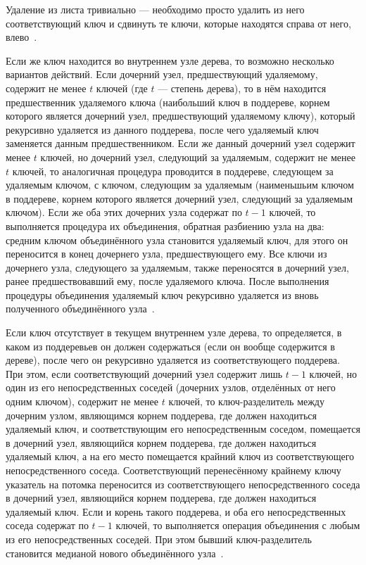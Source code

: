 \documentclass[a4paper,12pt]{article}
\begin{document}
	Удаление из листа тривиально --- необходимо просто удалить из него соответствующий ключ и сдвинуть те ключи, которые находятся справа от него, влево~\cite{Kormen}.
	
	Если же ключ находится во внутреннем узле дерева, то возможно несколько вариантов действий. Если дочерний узел, предшествующий удаляемому, содержит не менее $t$ ключей (где $t$ --- степень дерева), то в нём находится предшественник удаляемого ключа (наибольший ключ в поддереве, корнем которого является дочерний узел, предшествующий удаляемому ключу), который рекурсивно удаляется из данного поддерева, после чего удаляемый ключ заменяется данным предшественником. Если же данный дочерний узел содержит менее $t$ ключей, но дочерний узел, следующий за удаляемым, содержит не менее $t$ ключей, то аналогичная процедура проводится в поддереве, следующем за удаляемым ключом, с ключом, следующим за удаляемым (наименьшьим ключом в поддереве, корнем которого является дочерний узел, следующий за удаляемым ключом). Если же оба этих дочерних узла содержат по $t-1$ ключей, то выполняется процедура их объединения, обратная разбиению узла на два: средним ключом объединённого узла становится удаляемый ключ, для этого он переносится в конец дочернего узла, предшествующего ему. Все ключи из дочернего узла, следующего за удаляемым, также переносятся в дочерний узел, ранее предшествовавший ему, после удаляемого ключа. После выполнения процедуры объединения удаляемый ключ рекурсивно удаляется из вновь полученного объединённого узла~\cite{Kormen}.
	
	Если ключ отсутствует в текущем внутреннем узле дерева, то определяется, в каком из поддеревьев он должен содержаться (если он вообще содержится в дереве), после чего он рекурсивно удаляется из соответствующего поддерева. При этом, если соответствующий дочерний узел содержит лишь $t-1$ ключей, но один из его непосредственных соседей (дочерних узлов, отделённых от него одним ключом), содержит не менее $t$ ключей, то ключ-разделитель между дочерним узлом, являющимся корнем поддерева, где должен находиться удаляемый ключ, и соответствующим его непосредственным соседом, помещается в дочерний узел, являющийся корнем поддерева, где должен находиться удаляемый ключ, а на его место помещается крайний ключ из соответствующего непосредственного соседа. Соответствующий перенесённому крайнему ключу указатель на потомка переносится из соответствующего непосредственного соседа в дочерний узел, являющийся корнем поддерева, где должен находиться удаляемый ключ. Если и корень такого поддерева, и оба его непосредственных соседа содержат по $t-1$ ключей, то выполняется операция объединения с любым из его непосредственных соседей. При этом бывший ключ-разделитель становится медианой нового объединённого узла~\cite{Kormen}.
	
\end{document}
